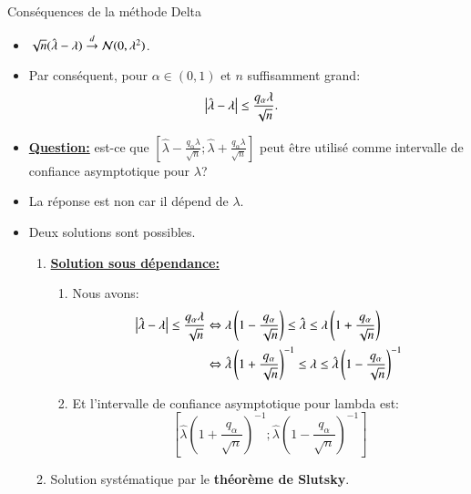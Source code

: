 \begin{frame}
    [allowframebreaks]{Conséquences de la méthode Delta}
    \begin{itemize}
        \item $\sqrt{n}(\hat{\lambda}-\lambda) \overset{d}{\rightarrow} \mathcal{N}(0,\lambda^2)$.
        \item Par conséquent, pour $\alpha\in(0,1)$ et $n$ suffisamment grand: 
        \begin{align*}
            \left\vert {\hat{\lambda}-\lambda} \right\vert &\leq \frac{q_\alpha\lambda}{\sqrt{n}}.
        \end{align*}
        \item \textbf{\underline{Question:}} est-ce que 
        $\left[\hat{\lambda} - \frac{q_\alpha\lambda}{\sqrt{n}}; \hat{\lambda} 
        + \frac{q_\alpha\lambda}{\sqrt{n}}\right]$ peut être utilisé comme intervalle de confiance asymptotique pour $\lambda$?
        \item La réponse est non car il dépend de $\lambda$.
        \framebreak
        \item Deux solutions sont possibles.
        \begin{enumerate}
        \item \textbf{\underline{Solution sous dépendance:}}
        \begin{enumerate}[-]
        \item Nous avons:
            \begin{align*}
                \left\vert {\hat{\lambda}-\lambda} \right\vert \leq \frac{q_\alpha\lambda}{\sqrt{n}}&\Leftrightarrow 
                \lambda\left(1- \frac{q_\alpha}{\sqrt{n}}\right)\leq \hat{\lambda}
                \leq \lambda\left(1+ \frac{q_\alpha}{\sqrt{n}}\right)\\
                &\Leftrightarrow \hat{\lambda}\left(1 + \frac{q_\alpha}{\sqrt{n}}\right)^{-1}
                \leq \lambda \leq \hat{\lambda}\left(1 - \frac{q_\alpha}{\sqrt{n}}\right)^{-1}
            \end{align*}
        \item Et l'intervalle de confiance asymptotique pour lambda est: 
        \[
            \left[\hat{\lambda}\left(1 + \frac{q_\alpha}{\sqrt{n}}\right)^{-1}; \hat{\lambda}\left(1 - \frac{q_\alpha}{\sqrt{n}}\right)^{-1}\right]
        \]
        \end{enumerate}
        \item Solution systématique par le \textbf{théorème de Slutsky}.
    \end{enumerate}
    \end{itemize}
\end{frame}
